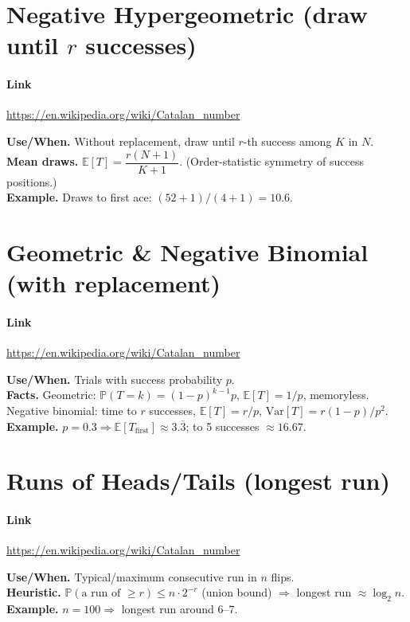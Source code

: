 \documentclass[11pt,A4,twoside]{article}
\let\oldsection\section
\renewcommand{\section}{\FloatBarrier\oldsection}
\numberwithin{equation}{section}
\newcommand{\E}{\mathbb{E}}
\theoremstyle{definition}
\theoremstyle{remark}
\newcommand{\Var}{\mathrm{Var}}
\newcommand{\Prob}{\mathbb{P}}
\begin{document}
\section{Negative Hypergeometric (draw until \(r\) successes)}

\paragraph{Link} \url{https://en.wikipedia.org/wiki/Catalan_number}

\textbf{Use/When.} Without replacement, draw until \(r\)-th success among \(K\) in \(N\).\\
\textbf{Mean draws.} \(\E[T]=\dfrac{r(N+1)}{K+1}\). (Order-statistic symmetry of success positions.)\\
\textbf{Example.} Draws to first ace: \((52+1)/(4+1)=10.6\).

\section{Geometric \& Negative Binomial (with replacement)}
\paragraph{Link} \url{https://en.wikipedia.org/wiki/Catalan_number}

\textbf{Use/When.} Trials with success probability \(p\).\\
\textbf{Facts.} Geometric: \(\Prob(T=k)=(1-p)^{k-1}p\), \(\E[T]=1/p\), memoryless. Negative binomial: time to \(r\) successes, \(\E[T]=r/p\), \(\Var[T]=r(1-p)/p^2\).\\
\textbf{Example.} \(p=0.3\Rightarrow \E[T_{\text{first}}]\approx 3.\overline{3}\); to 5 successes \(\approx 16.67\).

\section{Runs of Heads/Tails (longest run)}
\paragraph{Link} \url{https://en.wikipedia.org/wiki/Catalan_number}

\textbf{Use/When.} Typical/maximum consecutive run in \(n\) flips.\\
\textbf{Heuristic.} \(\Prob(\text{a run of }\ge r)\le n\cdot 2^{-r}\) (union bound) \(\Rightarrow\) longest run \(\approx \log_2 n\).\\
\textbf{Example.} \(n=100\Rightarrow\) longest run around \(6\)–\(7\).
\end{document}
